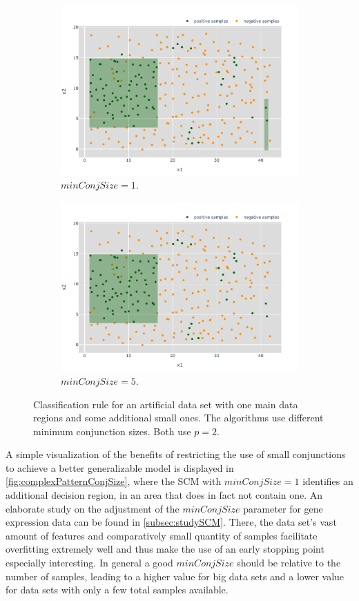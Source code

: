 \begin{figure}
    \centering
    \begin{subfigure}{\textwidth}
        \centering
        \includegraphics[width=0.85\columnwidth]{figures/complex_pattern_conj_size_1.pdf}
        \caption{\(minConjSize = 1\).}
    \end{subfigure}
    \hfill
    \begin{subfigure}{\textwidth}
        \centering
        \includegraphics[width=0.85\columnwidth]{figures/complex_pattern_conj_size_5.pdf}
        \caption{\(minConjSize = 5\).}
    \end{subfigure}
    \caption{Classification rule for an artificial data set with one main data regions and some additional small ones.
    The algorithms use different minimum conjunction sizes. Both use \(p = 2\).}\label{fig:complexPatternConjSize}
\end{figure}

A simple visualization of the benefits of restricting the use of small conjunctions 
to achieve a better generalizable model is displayed in \autoref{fig:complexPatternConjSize}, where
the SCM with \(minConjSize = 1\) identifies an additional decision region, in an area that does in fact not contain one. 
An elaborate study on the adjustment of the \(minConjSize\) parameter for gene expression data can be found in \autoref{subsec:studySCM}.
There, the data set's vast amount of features and comparatively small quantity of samples facilitate overfitting extremely well and thus make the use of an early stopping point
especially interesting.
In general a good \(minConjSize\) should be relative to the number of samples, leading to a higher value for big data sets and a lower
value for data sets with only a few total samples available.

